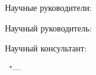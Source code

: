 %
\vspace{0pt plus4fill} %
\begin{flushright}
\ifdefined\supervisorTwoFio
Научные руководители:

\supervisorRegalia

\ifdefined\supervisorDead
\framebox{\supervisorFio}
\else
\supervisorFio
\fi

\supervisorTwoRegalia

\ifdefined\supervisorTwoDead
\framebox{\supervisorTwoFio}
\else
\supervisorTwoFio
\fi
\else

Научный руководитель:

\supervisorRegalia

\ifdefined\supervisorDead
\framebox{\supervisorFio}
\else
\supervisorFio
\fi
\fi

\vspace{0pt plus2fill} 

Научный консультант:

\consultantRegalia

\consultantFio


\end{flushright}
%
\vspace{0pt plus4fill} %
{\centering\thesisCity\ "--- \thesisYear\par}
